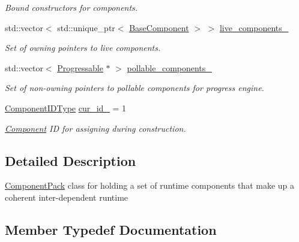 \begin{DoxyCompactItemize}
\begin{DoxyCompactList}\small\item\em Bound constructors for components. \end{DoxyCompactList}\item 
std\+::vector$<$ std\+::unique\+\_\+ptr$<$ \hyperlink{structvt_1_1runtime_1_1component_1_1_base_component}{Base\+Component} $>$ $>$ \hyperlink{structvt_1_1runtime_1_1component_1_1_component_pack_a4df7d33cbf2efa5e0a93e335ecced3df}{live\+\_\+components\+\_\+}
\begin{DoxyCompactList}\small\item\em Set of owning pointers to live components. \end{DoxyCompactList}\item 
std\+::vector$<$ \hyperlink{structvt_1_1runtime_1_1component_1_1_progressable}{Progressable} $\ast$ $>$ \hyperlink{structvt_1_1runtime_1_1component_1_1_component_pack_a1ef5fa947ed75d4451289e70732374cb}{pollable\+\_\+components\+\_\+}
\begin{DoxyCompactList}\small\item\em Set of non-\/owning pointers to pollable components for progress engine. \end{DoxyCompactList}\item 
\hyperlink{namespacevt_ab6ac935c168b809c422d5121da4f2700}{Component\+I\+D\+Type} \hyperlink{structvt_1_1runtime_1_1component_1_1_component_pack_a4163295f78b9dbd6e135783cf6d2ccce}{cur\+\_\+id\+\_\+} = 1
\begin{DoxyCompactList}\small\item\em \hyperlink{structvt_1_1runtime_1_1component_1_1_component}{Component} ID for assigning during construction. \end{DoxyCompactList}\end{DoxyCompactItemize}


\subsection{Detailed Description}
{\ttfamily \hyperlink{structvt_1_1runtime_1_1component_1_1_component_pack}{Component\+Pack}} class for holding a set of runtime components that make up a coherent inter-\/dependent runtime 

\subsection{Member Typedef Documentation}
\mbox{\label{structvt_1_1runtime_1_1component_1_1_component_pack_aa4389ab338cdac3a8900a9e777c0d3c9}} 
